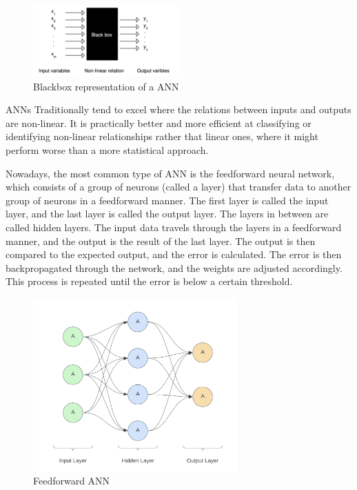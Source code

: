 \begin{figure}
	\centering
	\includegraphics[width=0.5\textwidth]{images/ann.png}
	\caption{Blackbox representation of a ANN}
	\label{fig:neuron}
\end{figure}

ANNs Traditionally tend to excel where the relations between inputs and outputs are non-linear. It is practically better and more efficient at classifying or identifying non-linear relationships rather that linear ones, where it might perform worse than a more statistical approach.

Nowadays, the most common type of ANN is the feedforward neural network, which consists of a group of neurons (called a layer) that transfer data to another group of neurons in a feedforward manner. The first layer is called the input layer, and the last layer is called the output layer. The layers in between are called hidden layers. The input data travels through the layers in a feedforward manner, and the output is the result of the last layer. The output is then compared to the expected output, and the error is calculated. The error is then backpropagated through the network, and the weights are adjusted accordingly. This process is repeated until the error is below a certain threshold.

\begin{figure}[h]
	\centering
	\includegraphics[width=0.7\textwidth]{images/feedforwardANN.png}
	\caption{Feedforward ANN}
\end{figure}

